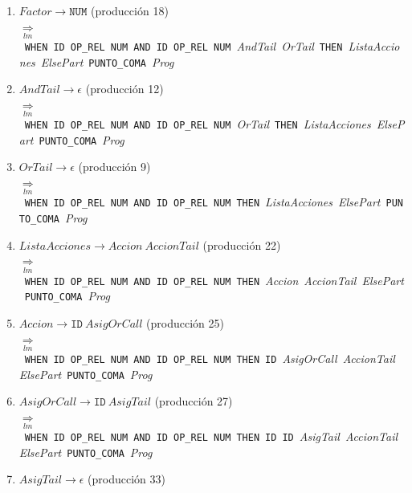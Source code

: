 \documentclass[12pt,a4paper]{article}
\begin{document}
{\begin{enumerate}[leftmargin=1.2cm, itemsep=3pt]
\item $\mathit{Factor} \to \mathtt{NUM}$ (producción 18)\\
$\underset{lm}{\Rightarrow}$\ \texttt{WHEN}\ \texttt{ID}\ \texttt{OP\_REL}\ \texttt{NUM}\ \texttt{AND}\ \texttt{ID}\ \texttt{OP\_REL}\ \texttt{NUM}\ \textit{AndTail}\ \textit{OrTail}\ \texttt{THEN}\ \textit{ListaAcciones}\ \textit{ElsePart}\ \texttt{PUNTO\_COMA}\ \textit{Prog}
\item $\mathit{AndTail} \to \epsilon$ (producción 12)\\
$\underset{lm}{\Rightarrow}$\ \texttt{WHEN}\ \texttt{ID}\ \texttt{OP\_REL}\ \texttt{NUM}\ \texttt{AND}\ \texttt{ID}\ \texttt{OP\_REL}\ \texttt{NUM}\ \textit{OrTail}\ \texttt{THEN}\ \textit{ListaAcciones}\ \textit{ElsePart}\ \texttt{PUNTO\_COMA}\ \textit{Prog}
\item $\mathit{OrTail} \to \epsilon$ (producción 9)\\
$\underset{lm}{\Rightarrow}$\ \texttt{WHEN}\ \texttt{ID}\ \texttt{OP\_REL}\ \texttt{NUM}\ \texttt{AND}\ \texttt{ID}\ \texttt{OP\_REL}\ \texttt{NUM}\ \texttt{THEN}\ \textit{ListaAcciones}\ \textit{ElsePart}\ \texttt{PUNTO\_COMA}\ \textit{Prog}
\item $\mathit{ListaAcciones} \to \mathit{Accion}\ \mathit{AccionTail}$ (producción 22)\\
$\underset{lm}{\Rightarrow}$\ \texttt{WHEN}\ \texttt{ID}\ \texttt{OP\_REL}\ \texttt{NUM}\ \texttt{AND}\ \texttt{ID}\ \texttt{OP\_REL}\ \texttt{NUM}\ \texttt{THEN}\ \textit{Accion}\ \textit{AccionTail}\ \textit{ElsePart}\ \texttt{PUNTO\_COMA}\ \textit{Prog}
\item $\mathit{Accion} \to \mathtt{ID}\ \mathit{AsigOrCall}$ (producción 25)\\
$\underset{lm}{\Rightarrow}$\ \texttt{WHEN}\ \texttt{ID}\ \texttt{OP\_REL}\ \texttt{NUM}\ \texttt{AND}\ \texttt{ID}\ \texttt{OP\_REL}\ \texttt{NUM}\ \texttt{THEN}\ \texttt{ID}\ \textit{AsigOrCall}\ \textit{AccionTail}\ \textit{ElsePart}\ \texttt{PUNTO\_COMA}\ \textit{Prog}
\item $\mathit{AsigOrCall} \to \mathtt{ID}\ \mathit{AsigTail}$ (producción 27)\\
$\underset{lm}{\Rightarrow}$\ \texttt{WHEN}\ \texttt{ID}\ \texttt{OP\_REL}\ \texttt{NUM}\ \texttt{AND}\ \texttt{ID}\ \texttt{OP\_REL}\ \texttt{NUM}\ \texttt{THEN}\ \texttt{ID}\ \texttt{ID}\ \textit{AsigTail}\ \textit{AccionTail}\ \textit{ElsePart}\ \texttt{PUNTO\_COMA}\ \textit{Prog}
\item $\mathit{AsigTail} \to \epsilon$ (producción 33)\\

\end{enumerate}}
\end{document}
